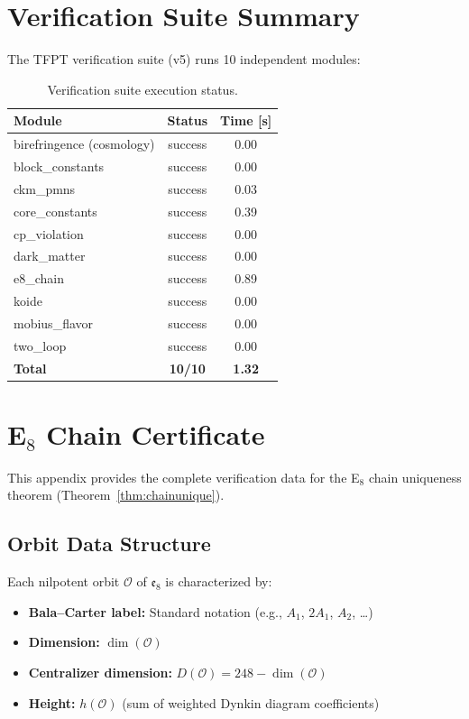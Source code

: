 \section{Verification Suite Summary}

The TFPT verification suite (v5) runs 10 independent modules:

\begin{table}[H]
\centering
\begin{tabular}{@{}lcc@{}}
\toprule
\textbf{Module} & \textbf{Status} & \textbf{Time [s]}\\
\midrule
birefringence (cosmology) & success & 0.00\\
block\_constants & success & 0.00\\
ckm\_pmns & success & 0.03\\
core\_constants & success & 0.39\\
cp\_violation & success & 0.00\\
dark\_matter & success & 0.00\\
e8\_chain & success & 0.89\\
koide & success & 0.00\\
mobius\_flavor & success & 0.00\\
two\_loop & success & 0.00\\
\midrule
\textbf{Total} & \textbf{10/10} & \textbf{1.32}\\
\bottomrule
\end{tabular}
\caption{Verification suite execution status.}
\end{table}

\section{E$_8$ Chain Certificate}
\label{app:E8cert}

This appendix provides the complete verification data for the E$_8$ chain uniqueness 
theorem (Theorem~\ref{thm:chainunique}).

\subsection{Orbit Data Structure}

Each nilpotent orbit $\mathcal{O}$ of $\mathfrak{e}_8$ is characterized by:
\begin{itemize}[leftmargin=1.5em, topsep=2pt, itemsep=1pt]
    \item \textbf{Bala--Carter label:} Standard notation (e.g., $A_1$, $2A_1$, $A_2$, \ldots)
    \item \textbf{Dimension:} $\dim(\mathcal{O})$
    \item \textbf{Centralizer dimension:} $D(\mathcal{O}) = 248 - \dim(\mathcal{O})$
    \item \textbf{Height:} $h(\mathcal{O})$ (sum of weighted Dynkin diagram coefficients)
\end{itemize}

